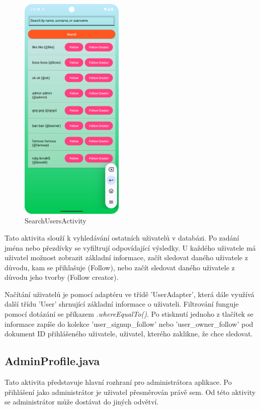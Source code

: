 \begin{figure}[H]
    \centering
    \includegraphics[height=11cm]{Images/Search_users_Following.png}
    \caption{SearchUsersActivity}
    \label{fig:Update-account}
\end{figure}

Tato aktivita slouží k vyhledávání ostatních uživatelů v databázi. Po zadání jména nebo přezdívky se vyfiltrují odpovídající výsledky. U každého uživatele má uživatel možnost zobrazit základní informace, začít sledovat daného uživatele z důvodu, kam se přihlašuje (Follow), nebo začít sledovat daného uživatele z důvodu jeho tvorby (Follow creator).


Načítání uživatelů je pomocí adaptéru ve třídě 'UserAdapter', která dále využívá další třídu 'User' shrnující základní informace o uživateli. Filtrování funguje pomocí dotázání se příkazem \textit{.whereEqualTo()}. Po stisknutí jednoho z tlačítek se informace zapíše do kolekce      'user\_signup\_follow' nebo 'user\_owner\_follow' pod dokument ID přihlášeného uživatele, uživatel, kterého zaklikne, že chce sledovat.
\cite{FirebaseFirestoreFilter}






\subsection*{AdminProfile.java}

Tato aktivita představuje hlavní rozhraní pro administrátora aplikace. Po přihlášení jako administrátor je uživatel přesměrován právě sem. Od této aktivity se administrátor může dostávat do jiných odvětví.

